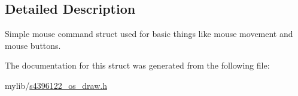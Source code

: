 \subsection{Detailed Description}
Simple mouse command struct used for basic things like mouse movement and mouse buttons. 

The documentation for this struct was generated from the following file\+:\begin{DoxyCompactItemize}
\item 
mylib/\hyperlink{s4396122__os__draw_8h}{s4396122\+\_\+os\+\_\+draw.\+h}\end{DoxyCompactItemize}
